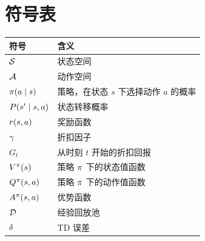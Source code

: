 \chapter{符号表}

\begin{longtable}{p{3cm}p{10cm}}
  \toprule
  符号 & 含义 \\
  \midrule
  $\mathcal{S}$ & 状态空间 \\
  $\mathcal{A}$ & 动作空间 \\
  $\pi(a\mid s)$ & 策略，在状态 $s$ 下选择动作 $a$ 的概率 \\
  $P(s'\mid s,a)$ & 状态转移概率 \\
  $r(s,a)$ & 奖励函数 \\
  $\gamma$ & 折扣因子 \\
  $G_t$ & 从时刻 $t$ 开始的折扣回报 \\
  $V^{\pi}(s)$ & 策略 $\pi$ 下的状态值函数 \\
  $Q^{\pi}(s,a)$ & 策略 $\pi$ 下的动作值函数 \\
  $A^{\pi}(s,a)$ & 优势函数 \\
  $\mathcal{D}$ & 经验回放池 \\
  $\delta$ & TD 误差 \\
  \bottomrule
\end{longtable}
